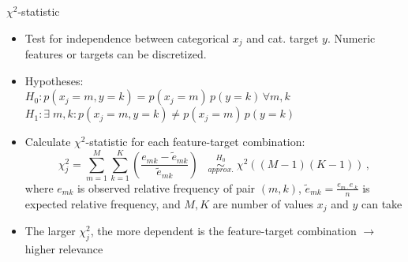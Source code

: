 \documentclass[11pt,compress,t,notes=noshow, xcolor=table]{beamer}
\begin{document}
  \begin{vbframe}{$\chi^2$-statistic}
  \begin{itemize}
    \item Test for independence between categorical $x_j$ and cat. target $y$. Numeric features or targets can be discretized.
    \item Hypotheses: \\
    $H_0: p(x_j = m, y = k) = p(x_j = m)\, p(y = k) \,\forall m, k$\\


    $H_1: \exists \; m, k: p(x_j = m, y = k) \neq p(x_j = m)\, p(y = k)$
    \item Calculate $\chi^2$-statistic for each feature-target combination:
      $$ \chi_j^2 = \sum_{m = 1}^{M} \sum_{k=1}^{K} (\frac{e_{mk} - \tilde{e}_{mk}}{\tilde{e}_{mk}}) \;\;\;   \stackrel{H_0}{\underset{approx.}{\sim}} \; \chi^2 ((M-1)(K-1))\,,$$
    where $e_{mk}$ is observed relative frequency of pair $(m,k)$, $\tilde{e}_{mk} = \frac{e_{m \cdot} e_{\cdot k}}{n}$ is expected relative frequency, and $M,K$ are number of values $x_j$ and $y$ can take
    \item The larger $\chi_j^2$, the more dependent is the feature-target combination $\rightarrow$ higher relevance
  \end{itemize}
  \end{vbframe}
\end{document}

